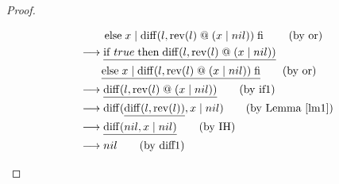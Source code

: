 \documentclass[12pt, a4paper]{article}
\newcommand{\rel}[1]{\mathrel{#1}}
\newcommand{\rmx}[1]{\mathrm{#1}}
\newcommand{\larrow}{\longrightarrow}
\newcommand{\under}{\underline}
\begin{document}
\begin{proof}
\begin{description}
\begin{align*}
	&\quad \quad \rel{\rmx{else}} x \rel{|} \rmx{diff}(l, \rmx{rev}(l) \rel{@}(x \rel{|} nil)) \rel{\rmx{fi}} \tag{by or} \\
	&\larrow \under{\rel{\rmx{if}} true \rel{\rmx{then}} \rmx{diff}(l, \rmx{rev}(l) \rel{@} (x \rel{|} nil))} \\
	&\quad \quad \under{\rel{\rmx{else}} x \rel{|} \rmx{diff}(l, \rmx{rev}(l) \rel{@}(x \rel{|} nil)) \rel{\rmx{fi}}} \tag{by or} \\
	&\larrow \under{\rmx{diff}(l, \rmx{rev}(l) \rel{@} (x \rel{|} nil))} \tag{by if1} \\
	&\larrow \rmx{diff}(\under{\rmx{diff}(l, \rmx{rev}(l))}, x \rel{|} nil) \tag{by Lemma~\ref{lm1}} \\	
&\larrow \under{\rmx{diff}(nil, x \rel{|} nil)} \tag{by IH} \\
&\larrow nil \tag{by diff1}
\end{align*}

\end{description}

\end{proof}
\end{document}
